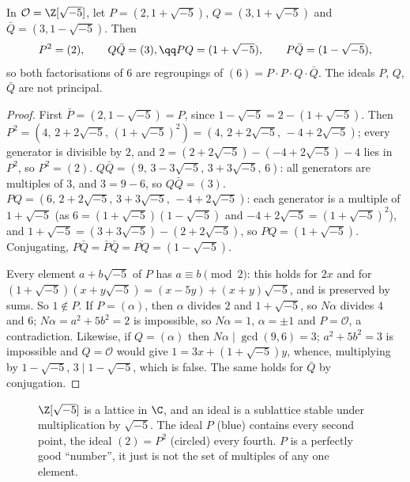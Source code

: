 \begin{proposition}\label{prop:six}
In $\mathcal O=\Z[\sqrt{-5}]$, let $P=(2,1+\sqrt{-5})$, $Q=(3,1+\sqrt{-5})$ and $\bar Q=(3,1-\sqrt{-5})$. Then
\[
\begin{gathered}P^2=(2),\qquad Q\bar Q=(3),\qq PQ=(1+\sqrt{-5}),\qquad P\bar Q=(1-\sqrt{-5}),\end{gathered}
\]
so both factorisations of $6$ are regroupings of $(6)=P\cdot P\cdot Q\cdot\bar Q$. The ideals $P$, $Q$, $\bar Q$ are not principal.
\end{proposition}
\begin{proof}
First $\bar P=(2,1-\sqrt{-5})=P$, since $1-\sqrt{-5}=2-(1+\sqrt{-5})$. Then
$P^2=(4,\,2+2\sqrt{-5},\,(1+\sqrt{-5})^2)=(4,\,2+2\sqrt{-5},\,-4+2\sqrt{-5})$; every generator is divisible by $2$, and $2=(2+2\sqrt{-5})-(-4+2\sqrt{-5})-4$ lies in $P^2$, so $P^2=(2)$.
$Q\bar Q=(9,\,3-3\sqrt{-5},\,3+3\sqrt{-5},\,6)$: all generators are multiples of $3$, and $3=9-6$, so $Q\bar Q=(3)$.
$PQ=(6,\,2+2\sqrt{-5},\,3+3\sqrt{-5},\,-4+2\sqrt{-5})$: each generator is a multiple of $1+\sqrt{-5}$ (as $6=(1+\sqrt{-5})(1-\sqrt{-5})$ and $-4+2\sqrt{-5}=(1+\sqrt{-5})^2$), and $1+\sqrt{-5}=(3+3\sqrt{-5})-(2+2\sqrt{-5})$, so $PQ=(1+\sqrt{-5})$. Conjugating, $P\bar Q=\bar P\bar Q=\overline{PQ}=(1-\sqrt{-5})$.

Every element $a+b\sqrt{-5}$ of $P$ has $a\equiv b\pmod2$: this holds for $2x$ and for $(1+\sqrt{-5})(x+y\sqrt{-5})=(x-5y)+(x+y)\sqrt{-5}$, and is preserved by sums. So $1\notin P$. If $P=(\alpha)$, then $\alpha$ divides $2$ and $1+\sqrt{-5}$, so $N\alpha$ divides $4$ and $6$; $N\alpha=a^2+5b^2=2$ is impossible, so $N\alpha=1$, $\alpha=\pm1$ and $P=\mathcal O$, a contradiction. Likewise, if $Q=(\alpha)$ then $N\alpha\mid\gcd(9,6)=3$; $a^2+5b^2=3$ is impossible and $Q=\mathcal O$ would give $1=3x+(1+\sqrt{-5})y$, whence, multiplying by $1-\sqrt{-5}$, $3\mid1-\sqrt{-5}$, which is false. The same holds for $\bar Q$ by conjugation.
\end{proof}

\begin{figure}[ht]
\centering
{}
\caption{$\Z[\sqrt{-5}]$ is a lattice in $\C$, and an ideal is a sublattice stable under multiplication by $\sqrt{-5}$. The ideal $P$ (blue) contains every second point, the ideal $(2)=P^2$ (circled) every fourth. $P$ is a perfectly good ``number'', it just is not the set of multiples of any one element.}
\label{fig:lattice}
\end{figure}

